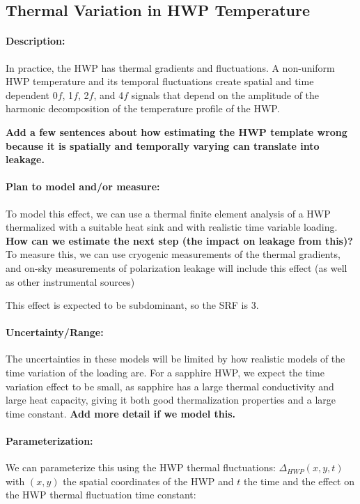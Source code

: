 \subsection{Thermal Variation in HWP Temperature}

\paragraph{Description:}
In practice, the HWP has thermal gradients and fluctuations. A non-uniform HWP temperature and its temporal fluctuations create spatial and time dependent 0$f$, 1$f$, 2$f$, and 4$f$ signals that depend on the amplitude of the harmonic decomposition of the temperature profile of the HWP. 

\textbf{Add a few sentences about how estimating the HWP template wrong because it is spatially and temporally varying can translate into leakage.}

\paragraph{Plan to model and/or measure:}
To model this effect, we can use a thermal finite element analysis of a HWP thermalized with a suitable heat sink and with realistic time variable loading. \textbf{How can we estimate the next step (the impact on leakage from this)?}
To measure this, we can use cryogenic measurements of the thermal gradients, and on-sky measurements of polarization leakage will include this effect (as well as other instrumental sources)

This effect is expected to be subdominant, so the SRF is 3.


\paragraph{Uncertainty/Range:}
The uncertainties in these models will be limited by how realistic models of the time variation of the loading are. For a sapphire HWP, we expect the time variation effect to be small, as sapphire has a large thermal conductivity and large heat capacity, giving it both good thermalization properties and a large time constant.
 \textbf{Add more detail if we model this.}

\paragraph{Parameterization:}
We can parameterize this using the HWP thermal fluctuations: $\Delta_{HWP}(x,y,t)$ with $(x,y)$ the spatial coordinates of the HWP and $t$ the time and the effect on the HWP thermal fluctuation time constant: 

